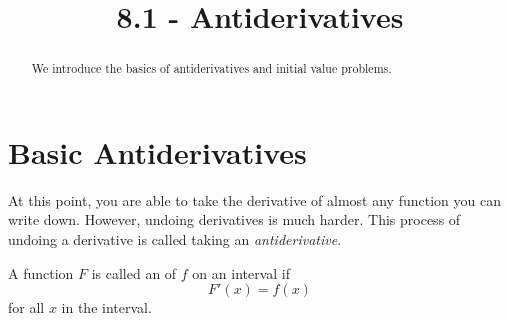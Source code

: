 \documentclass{ximera}
\title{8.1 - Antiderivatives}
\begin{document}
\begin{abstract}
  We introduce the basics of antiderivatives and initial value problems.
\end{abstract}
\maketitle

\section{Basic Antiderivatives}
%







At this point, you are able to take the derivative of almost any function you can write
down. However, undoing derivatives is much harder. This process of
undoing a derivative is called taking an \textit{antiderivative}.

\begin{definition}
A function $F$ is called an  of $f$ on an
interval if
\[
F'(x) = f(x)
\]
for all $x$ in the interval.
\end{definition}

\end{document}
